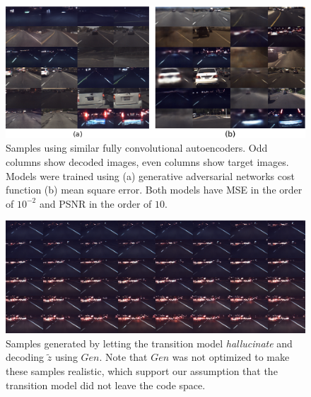 \documentclass{article} %
\begin{document}
\begin{figure}[t]
\centering
 \includegraphics[scale=1.0]{vae_gan_samples.eps}
 \caption{Samples using similar fully convolutional autoencoders. Odd columns show decoded images, even columns show target images.
 Models were trained using (a) generative adversarial networks cost function (b) mean square error. Both models have MSE in the order of $10^{-2}$ and PSNR in the order of $10$.}
   \label{fig:ganvsvae}

 \end{figure}

\begin{figure}[t]
\centering
 \includegraphics[scale=0.3]{rnn_samples.png}
 \caption{Samples generated by letting the transition model \textit{hallucinate} and decoding $\tilde{z}$ using $Gen$. Note that $Gen$ was not optimized to make these samples
 realistic, which support our assumption that the
 transition model did not leave the code space.}
   \label{fig:rnn_samples}

\end{figure}
\end{document}
